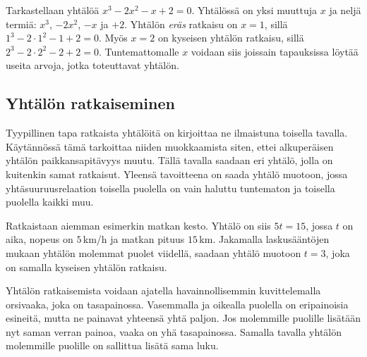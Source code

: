\begin{esimerkki}
Tarkastellaan yhtälöä $x^3-2x^2-x+2=0$. Yhtälössä on yksi muuttuja $x$ ja neljä termiä: $x^3$, $-2x^2$, $-x$ ja $+2$. Yhtälön \textit{eräs} ratkaisu on $x=1$, sillä $1^3-2\cdot{1^2}-1+2=0$. Myös $x=2$ on kyseisen yhtälön ratkaisu, sillä $2^3-2\cdot{2^2}-2+2=0$. Tuntemattomalle $x$ voidaan siis joissain tapauksissa löytää useita arvoja, jotka toteuttavat yhtälön. 
\end{esimerkki}

\subsection{Yhtälön ratkaiseminen}

Tyypillinen tapa ratkaista yhtälöitä on kirjoittaa ne ilmaistuna toisella tavalla. Käytännössä tämä tarkoittaa niiden muokkaamista siten, ettei alkuperäisen yhtälön paikkansapitävyys muutu. Tällä tavalla saadaan eri yhtälö, jolla on kuitenkin samat ratkaisut. Yleensä tavoitteena on saada yhtälö muotoon, jossa yhtäsuuruusrelaation toisella puolella on vain haluttu tuntematon ja toisella puolella kaikki muu. %

\begin{esimerkki} %
Ratkaistaan aiemman esimerkin matkan kesto. Yhtälö on siis $5t=15$, jossa $t$ on aika, nopeus on $5$\,km/h ja matkan pituus $15$\,km. Jakamalla laskusääntöjen mukaan yhtälön molemmat puolet viidellä, saadaan yhtälö muotoon $t=3$, joka on samalla kyseisen yhtälön ratkaisu.
\end{esimerkki}


Yhtälön ratkaisemista voidaan ajatella havainnollisemmin kuvittelemalla orsivaaka, joka on tasapainossa. Vasemmalla ja oikealla puolella on eripainoisia esineitä, mutta ne painavat yhteensä yhtä paljon. Jos molemmille puolille lisätään nyt saman verran painoa, vaaka on yhä tasapainossa. Samalla tavalla yhtälön molemmille puolille on sallittua lisätä sama luku.

